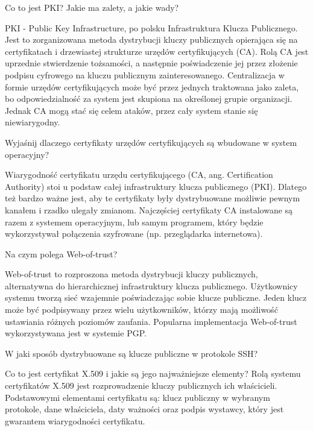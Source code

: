 \documentclass[answers,11pt]{exam}
\begin{document}
\begin{questions}

\question Co to jest PKI? Jakie ma zalety, a jakie wady?
\begin{solution}
PKI - Public Key Infrastructure, po polsku Infrastruktura Klucza Publicznego. Jest to zorganizowana metoda dystrybucji kluczy publicznych opierająca się na certyfikatach i drzewiastej strukturze urzędów certyfikujących (CA). Rolą CA jest uprzednie stwierdzenie tożsamości, a następnie poświadczenie jej przez złożenie podpisu cyfrowego na kluczu publicznym zainteresowanego. Centralizacja w formie urzędów certyfikujących może być przez jednych traktowana jako zaleta, bo odpowiedzialność za system jest skupiona na określonej grupie organizacji. Jednak CA mogą stać się celem ataków, przez cały system stanie się niewiarygodny.
\end{solution}

\question Wyjaśnij dlaczego certyfikaty urzędów certyfikujących są wbudowane w system operacyjny?
\begin{solution}
Wiarygodność certyfikatu urzędu certyfikującego (CA, ang. Certification Authority) stoi u podstaw całej infrastruktury klucza publicznego (PKI). Dlatego też bardzo ważne jest, aby te certyfikaty były dystrybuowane możliwie pewnym kanałem i rzadko ulegały zmianom. Najczęściej certyfikaty CA instalowane są razem z systemem operacyjnym, lub samym programem, który będzie wykorzystywał połączenia szyfrowane (np. przeglądarka internetowa).
\end{solution}

\question Na czym polega Web-of-trust?
\begin{solution}
Web-of-trust to rozproszona metoda dystrybucji kluczy publicznych, alternatywna do hierarchicznej infrastruktury klucza publicznego. Użytkownicy systemu tworzą sieć wzajemnie poświadczając sobie klucze publiczne. Jeden klucz może być podpisywany przez wielu użytkowników, którzy mają możliwość ustawiania różnych poziomów zaufania. Popularna implementacja Web-of-trust wykorzystywana jest w systemie PGP.
\end{solution}

\question W jaki sposób dystrybuowane są klucze publiczne w protokole SSH?

\question Co to jest certyfikat X.509 i jakie są jego najważniejsze elementy?
Rolą systemu certyfikatów X.509 jest rozprowadzenie kluczy publicznych ich właścicieli. Podstawowymi elementami certyfikatu są: klucz publiczny w wybranym protokole, dane właściciela, daty ważności oraz podpis wystawcy, który jest gwarantem wiarygodności certyfikatu.
\end{questions}
\end{document}
